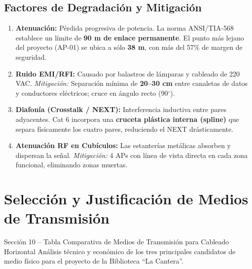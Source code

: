 \documentclass[12pt,a4paper]{article}
\begin{document}
\subsection{Factores de Degradación y Mitigación}
\begin{enumerate}[leftmargin=1.8em,label=\textbf{\arabic*.},itemsep=4pt]
  \item \textbf{Atenuación:} Pérdida progresiva de potencia. La norma ANSI/TIA-568 establece un límite de \textbf{90 m de enlace permanente}. El punto más lejano del proyecto (AP-01) se ubica a sólo \textbf{38 m}, con más del 57\% de margen de seguridad.

  \item \textbf{Ruido EMI/RFI:} Causado por balastros de lámparas y cableado de 220 VAC. \textit{Mitigación:} Separación mínima de \textbf{20--30 cm} entre canaletas de datos y conductores eléctricos; cruce en ángulo recto (90$^\circ$).

  \item \textbf{Diafonía (Crosstalk / NEXT):} Interferencia inductiva entre pares adyacentes. Cat 6 incorpora una \textbf{cruceta plástica interna (spline)} que separa físicamente los cuatro pares, reduciendo el NEXT drásticamente.

  \item \textbf{Atenuación RF en Cubículos:} Las estanterías metálicas absorben y dispersan la señal. \textit{Mitigación:} 4 APs con línea de vista directa en cada zona funcional, eliminando zonas muertas.
\end{enumerate}

\section{Selección y Justificación de Medios de Transmisión}

\begin{cajanorma}{Sección 10 -- Tabla Comparativa de Medios de Transmisión para Cableado Horizontal}
Análisis técnico y económico de los tres principales candidatos de medio físico para el proyecto de la Biblioteca ``La Cantera''.
\end{cajanorma}
\end{document}
